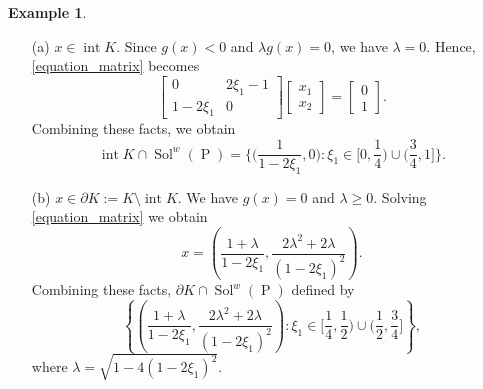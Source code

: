 \documentclass[]{interact}
\theoremstyle{plain}%
\theoremstyle{definition}
\newtheorem{example}{Example}[section]
\DeclareMathOperator{\Sol}{Sol}
\DeclareMathOperator{\Po}{P}
\DeclareMathOperator{\inte}{int}
\begin{document}
\begin{example}
\begin{enumerate}
		\item[(a)] $x\in \inte K$. Since $g(x)<0$ and $\lambda g(x)=0$, we have $\lambda=0$. Hence, \eqref{equation_matrix} becomes
		$$\begin{bmatrix}0& 2\xi_1- 1 \\ 
		1-2\xi_1& 0
		\end{bmatrix}\begin{bmatrix}x_1 \\ 
		x_2
		\end{bmatrix}=\begin{bmatrix}
		0\\ 
		1
		\end{bmatrix}.$$
		Combining these facts, we obtain
		$$\inte K\cap\Sol^w(\Po)=\Big\lbrace \Big( \frac{1}{1-2\xi_1},0\Big): \xi_1\in \big[0,\frac{1}{4}\big)\cup \big( \frac{3}{4},1\big]  \Big\rbrace.$$
		\item[(b)] $x\in \partial K:= K\setminus\inte K$. We have $g(x)=0$ and $\lambda \geq0$. Solving \eqref{equation_matrix} we obtain
		$$x=\left(\frac{1+\lambda}{1-2\xi_1},\frac{2\lambda^2+2\lambda}{(1-2\xi_1)^2}\right).$$
		Combining these facts, $\partial K\cap\Sol^w(\Po)$ defined by
		$$\left\lbrace\left(\frac{1+\lambda}{1-2\xi_1},\frac{2\lambda^2+2\lambda}{(1-2\xi_1)^2}\right): \xi_1\in \big[\frac{1}{4},\frac{1}{2}\big)\cup \big(\frac{1}{2},\frac{3}{4}\big]  \right\rbrace,$$
		where $\lambda=\sqrt{1-4(1-2\xi_1)^2}$.
	\end{enumerate}
	\begin{center}
		

\end{center}
\end{example}
\end{document}
